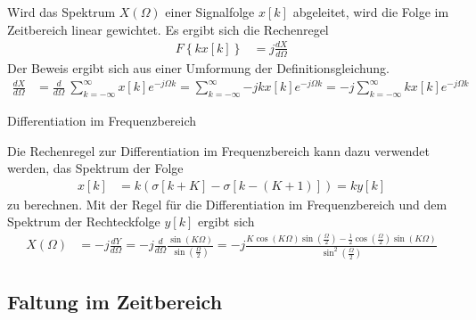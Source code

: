 Wird das Spektrum \(X(Ω)\) einer Signalfolge \(x[k]\) abgeleitet, wird die Folge im Zeitbereich linear gewichtet. Es ergibt sich die Rechenregel
\begin{align}
F\left\{ k  x[ k] \right\} &= j  \frac{dX}{d\Omega} \label{eq:7.69}
\end{align}
Der Beweis ergibt sich aus einer Umformung der Definitionsgleichung.
\begin{align}
\frac{dX}{d\Omega} &= \frac{d}{d\Omega}\ \sum\limits_{k = - \infty}^{\infty}{x[ k]  e^{- j  \Omega  k}} = \sum\limits_{k = - \infty}^{\infty}{- j  k  x[ k]  e^{- j  \Omega  k}} = - j  \sum\limits_{k = - \infty}^{\infty}{k  x[ k]  e^{- j  \Omega  k}} \label{eq:7.70}
\end{align}
\begin{example}{Differentiation im Frequenzbereich}
\label{example:beispiel-differentiation-im-frequenzbereich}

Die Rechenregel zur Differentiation im Frequenzbereich kann dazu verwendet werden, das Spektrum der Folge
\begin{align*}
x[ k] &= k  \left( \sigma[ k + K] - \sigma\left[ k - (K + 1) \right] \right) = k  y[ k] 
\end{align*}
zu berechnen. Mit der Regel für die Differentiation im Frequenzbereich und dem Spektrum der Rechteckfolge \(y[k]\) ergibt sich
\begin{align*}
X(\Omega) &= - j  \frac{dY}{d\Omega} = - j  \frac{d}{d\Omega}\frac{\sin(K  \Omega)}{\sin\left( \frac{\Omega}{2} \right)} = - j  \frac{K  \cos(K  \Omega)  \sin\left( \frac{\Omega}{2} \right) - \frac{1}{2}  \cos\left( \frac{\Omega}{2} \right)  \sin(K  \Omega)}{\sin^{2}\left( \frac{\Omega}{2} \right)} 
\end{align*}
\end{example}

\subsection{Faltung im Zeitbereich}\label{sec:faltung-im-zeitbereich}

